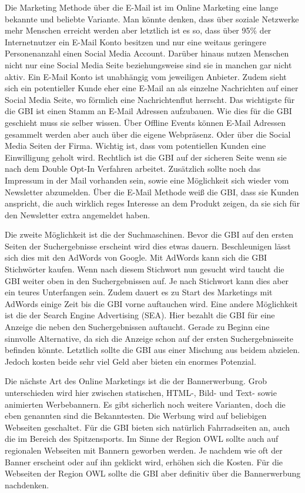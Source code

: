 Die Marketing Methode über die E-Mail ist im Online Marketing eine lange bekannte und beliebte Variante. Man könnte denken, dass über soziale Netzwerke mehr Menschen erreicht werden aber letztlich ist es so, dass über 95\% der Internetnutzer ein E-Mail Konto besitzen und nur eine weitaus geringere Personenanzahl einen Social Media Account. Darüber hinaus nutzen Menschen nicht nur eine Social Media Seite beziehungsweise sind sie in manchen gar nicht aktiv. Ein E-Mail Konto ist unabhängig vom jeweiligen Anbieter.  Zudem sieht sich ein potentieller Kunde eher eine E-Mail an als einzelne Nachrichten auf einer Social Media Seite, wo förmlich eine Nachrichtenflut herrscht. Das wichtigste für die GBI ist einen Stamm an E-Mail Adressen aufzubauen. Wie dies für die GBI geschieht muss sie selber wissen. Über Offline Events können E-Mail Adressen gesammelt werden aber auch über die eigene Webpräsenz. Oder über die Social Media Seiten der Firma. Wichtig ist, dass vom potentiellen Kunden eine Einwilligung geholt wird. Rechtlich ist die GBI auf der sicheren Seite wenn sie nach dem Double Opt-In Verfahren arbeitet. Zusätzlich sollte noch das Impressum in der Mail vorhanden sein, sowie eine Möglichkeit sich wieder vom Newsletter abzumelden. Über die E-Mail Methode weiß die GBI, dass sie Kunden anspricht, die auch wirklich reges Interesse an dem Produkt zeigen, da sie sich für den Newsletter extra angemeldet haben.

Die zweite Möglichkeit ist die der Suchmaschinen. Bevor die GBI auf den ersten Seiten der Suchergebnisse erscheint wird dies etwas dauern. Beschleunigen lässt sich dies mit den AdWords von Google. Mit AdWords kann sich die GBI Stichwörter kaufen. Wenn nach diesem Stichwort nun gesucht wird taucht die GBI weiter oben in den Suchergebnissen auf. Je nach Stichwort kann dies aber ein teures Unterfangen sein. Zudem dauert es zu Start des Marketings mit AdWords einige Zeit bis die GBI vorne auftauchen wird. Eine andere Möglichkeit ist die der Search Engine Advertising (SEA). Hier bezahlt die GBI für eine Anzeige die neben den Suchergebnissen auftaucht. Gerade zu Beginn eine sinnvolle Alternative, da sich die Anzeige schon auf der ersten Suchergebnisseite befinden könnte. Letztlich sollte die GBI aus einer Mischung aus beidem abzielen. Jedoch kosten beide sehr viel Geld aber bieten ein enormes Potenzial.

Die nächste Art des Online Marketings ist die der Bannerwerbung. Grob unterschieden wird hier zwischen statischen, HTML-, Bild- und Text- sowie animierten Werbebannern. Es gibt sicherlich noch weitere Varianten, doch die eben genannten sind die Bekanntesten. Die Werbung wird auf beliebigen Webseiten geschaltet. Für die GBI bieten sich natürlich Fahrradseiten an, auch die im Bereich des Spitzensports. Im Sinne der Region OWL sollte auch auf regionalen Webseiten mit Bannern geworben werden. Je nachdem wie oft der Banner erscheint oder auf ihn geklickt wird, erhöhen sich die Kosten. Für die Webseiten der Region OWL sollte die GBI aber definitiv über die Bannerwerbung nachdenken.

